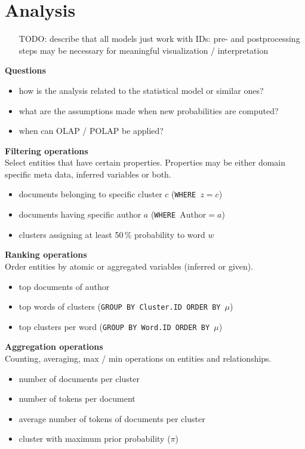 \section{Analysis}

\begin{itemize}
\item [TODO: describe that all models just work with IDs: pre- and postprocessing steps may be necessary for meaningful visualization / interpretation]
\end{itemize}

\textbf{Questions}
\begin{itemize}
\item how is the analysis related to the statistical model or similar ones?
\item what are the assumptions made when new probabilities are computed?
\item when can OLAP / POLAP be applied?
\end{itemize}

\textbf{Filtering operations}\\
Select entities that have certain properties. Properties may be either domain specific meta data, inferred variables or both.
\begin{itemize}
\item documents belonging to specific cluster $c$ (\texttt{WHERE $z = c$})
\item documents having specific author $a$ (\texttt{WHERE $\textrm{Author} = a$})
\item clusters assigning at least 50\,\% probability to word $w$
\end{itemize}

\textbf{Ranking operations}\\
Order entities by atomic or aggregated variables (inferred or given).
\begin{itemize}
\item top documents of author
\item top words of clusters (\texttt{GROUP BY \textrm{Cluster.ID} ORDER BY $\mu$})
\item top clusters per word (\texttt{GROUP BY \textrm{Word.ID} ORDER BY $\mu$})
\end{itemize}

\textbf{Aggregation operations}\\
Counting, averaging, max / min operations on entities and relationships.
\begin{itemize}
\item number of documents per cluster
\item number of tokens per document
\item average number of tokens of documents per cluster
\item cluster with maximum prior probability ($\pi$)
\end{itemize}
